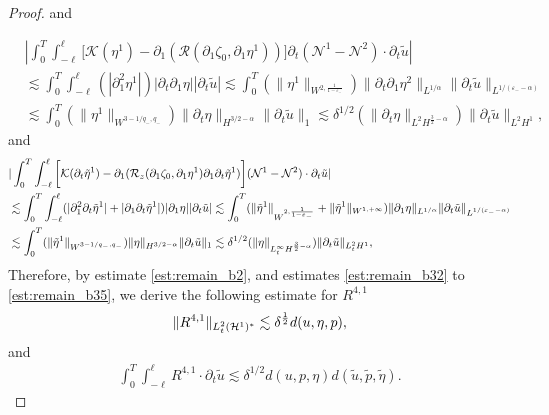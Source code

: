 \documentclass[letterpaper,reqno,10pt,twoside]{amsart}
\theoremstyle{definition}
\theoremstyle{remark}
\def\p{\partial}
\begin{document}
\begin{proof}
			\noindent and
			
			\begin{equation}\label{est:remain_b33}
				\begin{aligned}
					&|\int_0^T\int_{-\ell}^\ell \bigg[\mathcal{K}(\eta^{1})-\p_{1}(\mathcal{R}(\p_{1}\zeta_{0},\p_{1}\eta^{1}))\bigg]\p_{t}(\mathcal{N}^{1}-\mathcal{N}^{2})\cdot\p_t\tilde{u}|
					\\
					&\lesssim \int_0^T\int_{-\ell}^\ell(|\p_{1}^{2}\eta^{1}|)|\p_t\p_1\eta||\p_t\tilde{u}|\lesssim \int_0^T(\|\eta^{1}\|_{W^{2,\frac{1}{1-\varepsilon_{-}}}})
					\|\p_t\p_1\eta^2\|_{L^{1/\alpha}}\|\p_t\tilde{u}\|_{L^{1/(\varepsilon_--\alpha)}}\\
					&\lesssim\int_0^T (\|\eta^{1}\|_{W^{3-1/q_-,q_-}})\|\p_t\eta\|_{H^{3/2-\alpha}}\|\p_t\tilde{u}\|_1\lesssim \delta^{1/2}(\|\p_{t}\eta\|_{L^2H^{\frac{3}{2}-\alpha}})\|\p_t\tilde{u}\|_{L^2H^1},
				\end{aligned}
			\end{equation}
			and
			\begin{align}{\label{est:remain_b35}}
				\begin{aligned}
					&|\int_0^T\int_{-\ell}^\ell \bigg[\mathcal{K}(\p_{t}\tilde{\eta}^{1})-\p_{1}(\mathcal{R}_{z}(\p_{1}\zeta_{0},\p_{1}\eta^{1})\p_{1}\p_{t}\tilde{\eta}^{1})\bigg](\mathcal{N}^{1}-\mathcal{N}^{2})\cdot\p_t\tilde{u}|
					\\
					&\lesssim \int_0^T\int_{-\ell}^\ell(|\p_{1}^{2}\p_{t}\tilde{\eta}^{1}|+|\p_{1}\p_{t}\tilde{\eta}^{1}|)|\p_1\eta||\p_t\tilde{u}|\lesssim \int_0^T(\|\tilde{\eta}^{1}\|_{W^{2,\frac{1}{1-\varepsilon_{-}}}}+\|\tilde{\eta}^{1}\|_{W^{1,+\infty}})
					\|\p_1\eta\|_{L^{1/\alpha}}\|\p_t\tilde{u}\|_{L^{1/(\varepsilon_--\alpha)}}\\
					&\lesssim\int_0^T (\|\tilde{\eta}^{1}\|_{W^{3-1/q_-,q_-}})\|\eta\|_{H^{3/2-\alpha}}\|\p_t\tilde{u}\|_1\lesssim \delta^{1/2}(\|\eta\|_{L_{t}^{\infty}H^{\frac{3}{2}-\alpha}})\|\p_t\tilde{u}\|_{L_{t}^2H^1},
				\end{aligned}
			\end{align}
			Therefore, by estimate \eqref{est:remain_b2}, and estimates \eqref{est:remain_b32} to \eqref{est:remain_b35}, we derive the following estimate for $R^{4,1}$
			\begin{align}{\label{eq:remain_b3}}
				\begin{aligned}
					\|R^{4,1}\|_{L_{t}^{2}(\mathcal{H}^1)^{\ast}}\lesssim \delta^{\frac{1}{2}}d(u,\eta,p),
				\end{aligned}
			\end{align}
			and
			\begin{equation}\label{est:remain_b3}
				\begin{aligned}
					\int_0^T\int_{-\ell}^\ell R^{4,1}\cdot\p_t\tilde{u}\lesssim\delta^{1/2}d(u,p,\eta)d(\tilde{u},\tilde{p},\tilde{\eta}).
				\end{aligned}
			\end{equation}
			

\end{proof}
\end{document}
